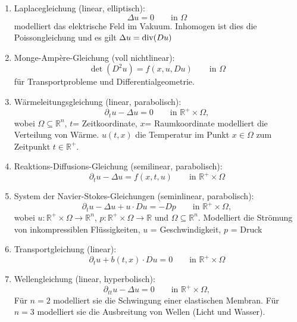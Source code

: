\begin{beispiele}
	\begin{enumerate}[1.]
		\item Laplacegleichung (linear, elliptisch):
		\begin{equation}
			\Delta u = 0 \qquad \text{in }\Omega
		\end{equation}
		modelliert das elektrische Feld im Vakuum. Inhomogen ist dies die Poissongleichung und es gilt $\Delta u = \operatorname{div}(Du)$
		\item Monge-Ampère-Gleichung (voll nichtlinear):
		\begin{equation}
			\det(D^2u)=f(x,u,Du) \qquad \text{in }\Omega
		\end{equation}
		für Transportprobleme und Differentialgeometrie.
		\item Wärmeleitungsgleichung (linear, parabolisch):
		\begin{equation}
			\partial_t u - \Delta u = 0 \qquad \text{in } \mathbb{R}^+ \times \Omega,
		\end{equation}
		wobei $\Omega \subseteq  \mathbb{R}^n$, $t$= Zeitkoordinate, $x$= Raumkoordinate modelliert die Verteilung von Wärme. $u(t,x)$ die Temperatur im Punkt $x \in \Omega$ zum Zeitpunkt
		$t \in \mathbb{R}^+$.
		\item Reaktions-Diffusions-Gleichung (semilinear, parabolisch):
		\begin{equation}
			\partial_t u - \Delta u = f(x,t,u) \qquad \text{in } \mathbb{R}^+ \times \Omega
		\end{equation}
		\item System der Navier-Stokes-Gleichungen (seminlinear, parabolisch):
		\begin{equation}
			\partial_t u - \Delta u + u \cdot Du = -Dp \qquad \text{in } \mathbb{R}^+ \times \Omega,
		\end{equation}
		wobei $u: \mathbb{R}^+ \times \Omega \to  \mathbb{R}^n$, $p: \mathbb{R}^+ \times \Omega \to \mathbb{R}$ und $\Omega \subseteq  \mathbb{R}^n$. Modelliert die Strömung von inkompressiblen Flüssigkeiten, $u$ = Geschwindigkeit, $p$ = Druck
		\item Transportgleichung (linear):
		\begin{equation}
			\partial_t u + b(t,x) \cdot Du = 0 \qquad \text{in } \mathbb{R}^+ \times \Omega 
		\end{equation}
		\item Wellengleichung (linear, hyperbolisch):
		\begin{equation}
			\partial_{tt}u - \Delta u = 0 \qquad \text{in } \mathbb{R}^+ \times \Omega,
		\end{equation}
		Für $n=2$ modelliert sie die Schwingung einer elastischen Membran. Für $n=3$ modelliert sie die Ausbreitung von Wellen (Licht und Wasser).
	\end{enumerate}
\end{beispiele}


